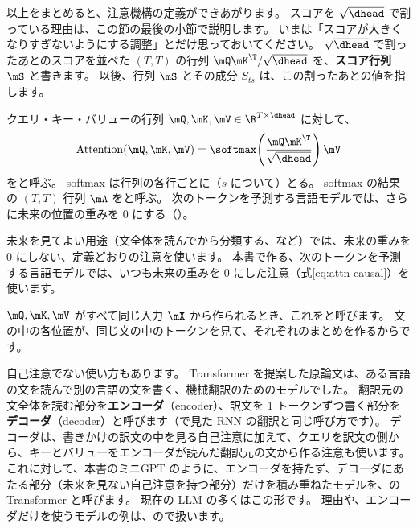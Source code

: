 以上をまとめると、注意機構の定義ができあがります。
スコアを $\sqrt{\dhead}$ で割っている理由は、この節の最後の小節で説明します。
いまは「スコアが大きくなりすぎないようにする調整」とだけ思っておいてください。
$\sqrt{\dhead}$ で割ったあとのスコアを並べた $(T,T)$ の行列 $\mQ\mK^\T/\sqrt{\dhead}$ を、\textbf{スコア行列} $\mS$ と書きます。
以後、行列 $\mS$ とその成分 $S_{ts}$ は、この割ったあとの値を指します。

\begin{definition}[縮小付き内積注意]
クエリ・キー・バリューの行列 $\mQ, \mK, \mV \in \R^{T\times\dhead}$ に対して、
\begin{equation}
\mathrm{Attention}(\mQ,\mK,\mV) = \softmax\!\left(\frac{\mQ\mK^\T}{\sqrt{\dhead}}\right)\mV
\label{eq:attn-sdpa}
\end{equation}
をと呼ぶ\cite{vaswani2017attention}。
softmax は行列の各行ごとに（$s$ について）とる。
softmax の結果の $(T,T)$ 行列 $\mA$ をと呼ぶ。
次のトークンを予測する言語モデルでは、さらに未来の位置の重みを 0 にする（）。
\end{definition}

未来を見てよい用途（文全体を読んでから分類する、など）では、未来の重みを 0 にしない、定義どおりの注意を使います。
本書で作る、次のトークンを予測する言語モデルでは、いつも未来の重みを 0 にした注意（式\eqref{eq:attn-causal}）を使います。

$\mQ, \mK, \mV$ がすべて同じ入力 $\mX$ から作られるとき、これをと呼びます。
文の中の各位置が、同じ文の中のトークンを見て、それぞれのまとめを作るからです。

自己注意でない使い方もあります。
Transformer を提案した原論文\cite{vaswani2017attention}は、ある言語の文を読んで別の言語の文を書く、機械翻訳のためのモデルでした。
翻訳元の文全体を読む部分を\textbf{エンコーダ}（encoder）、訳文を 1 トークンずつ書く部分を\textbf{デコーダ}（decoder）と呼びます（で見た RNN の翻訳と同じ呼び方です）。
デコーダは、書きかけの訳文の中を見る自己注意に加えて、クエリを訳文の側から、キーとバリューをエンコーダが読んだ翻訳元の文から作る注意も使います。
これに対して、本書のミニGPT のように、エンコーダを持たず、デコーダにあたる部分（未来を見ない自己注意を持つ部分）だけを積み重ねたモデルを、の Transformer と呼びます。
現在の LLM の多くはこの形です。
理由や、エンコーダだけを使うモデルの例は、ので扱います。

